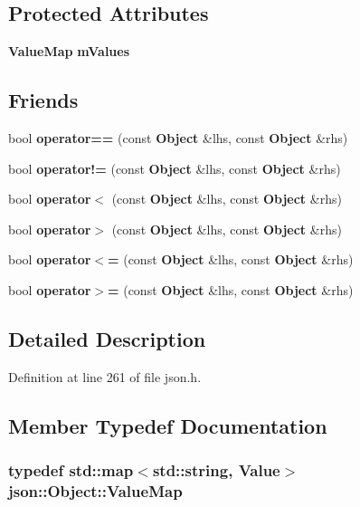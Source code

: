\subsection*{Protected Attributes}
\begin{DoxyCompactItemize}
\item 
{\bf Value\+Map} {\bf m\+Values}
\end{DoxyCompactItemize}
\subsection*{Friends}
\begin{DoxyCompactItemize}
\item 
bool {\bf operator==} (const {\bf Object} \&lhs, const {\bf Object} \&rhs)
\item 
bool {\bf operator!=} (const {\bf Object} \&lhs, const {\bf Object} \&rhs)
\item 
bool {\bf operator$<$} (const {\bf Object} \&lhs, const {\bf Object} \&rhs)
\item 
bool {\bf operator$>$} (const {\bf Object} \&lhs, const {\bf Object} \&rhs)
\item 
bool {\bf operator$<$=} (const {\bf Object} \&lhs, const {\bf Object} \&rhs)
\item 
bool {\bf operator$>$=} (const {\bf Object} \&lhs, const {\bf Object} \&rhs)
\end{DoxyCompactItemize}


\subsection{Detailed Description}


Definition at line 261 of file json.\+h.



\subsection{Member Typedef Documentation}
\subsubsection[{Value\+Map}]{\setlength{\rightskip}{0pt plus 5cm}typedef std\+::map$<$std\+::string, {\bf Value}$>$ {\bf json\+::\+Object\+::\+Value\+Map}}\label{classjson_1_1_object_aa4954dea50da7a887b6d9200408b0558}


